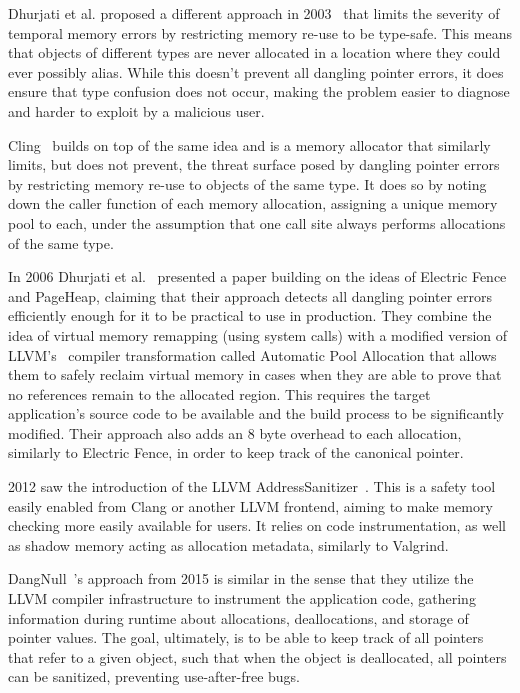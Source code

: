 Dhurjati et al. proposed a different approach in 2003~\cite{dhurjati2003memory} that limits the severity of temporal memory errors by restricting memory re-use to be type-safe. This means that objects of different types are never allocated in a location where they could ever possibly alias. While this doesn't prevent all dangling pointer errors, it does ensure that type confusion does not occur, making the problem easier to diagnose and harder to exploit by a malicious user.

Cling~\cite{akritidis2010cling} builds on top of the same idea and is a memory allocator that similarly limits, but does not prevent, the threat surface posed by dangling pointer errors by restricting memory re-use to objects of the same type. It does so by noting down the caller function of each memory allocation, assigning a unique memory pool to each, under the assumption that one call site always performs allocations of the same type.

In 2006 Dhurjati et al.~\cite{dhurjati2006efficiently} presented a paper building on the ideas of Electric Fence and PageHeap, claiming that their approach detects all dangling pointer errors efficiently enough for it to be practical to use in production. They combine the idea of virtual memory remapping (using system calls) with a modified version of LLVM's~\cite{llvm-web} compiler transformation called Automatic Pool Allocation that allows them to safely reclaim virtual memory in cases when they are able to prove that no references remain to the allocated region. This requires the target application's source code to be available and the build process to be significantly modified. Their approach also adds an 8 byte overhead to each allocation, similarly to Electric Fence, in order to keep track of the canonical pointer.

2012 saw the introduction of the LLVM AddressSanitizer~\cite{llvm-address-sanitizer2012}. This is a safety tool easily enabled from Clang or another LLVM frontend, aiming to make memory checking more easily available for users. It relies on code instrumentation, as well as shadow memory acting as allocation metadata, similarly to Valgrind.

DangNull~\cite{dangnull2015}'s approach from 2015 is similar in the sense that they utilize the LLVM compiler infrastructure to instrument the application code, gathering information during runtime about allocations, deallocations, and storage of pointer values. The goal, ultimately, is to be able to keep track of all pointers that refer to a given object, such that when the object is deallocated, all pointers can be sanitized, preventing use-after-free bugs. 

